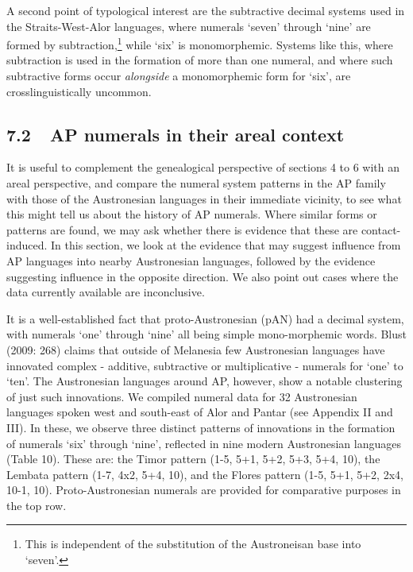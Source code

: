 A second point of typological interest are the subtractive decimal systems used in the Straits-West-Alor languages, where numerals {\textquoteleft}seven{\textquoteright} through {\textquoteleft}nine{\textquoteright} are formed by subtraction,\footnote{This is independent of the substitution of the Austroneisan base into {\textquoteleft}seven{\textquoteright}.} while {\textquoteleft}six{\textquoteright} is monomorphemic. Systems like this, where subtraction is used in the formation of more than one numeral, and where such subtractive forms occur \textit{alongside} a monomorphemic form for {\textquoteleft}six{\textquoteright}, are crosslinguistically uncommon. 

\subsection[7.2\ \ AP numerals in their areal context]{7.2\ \ AP numerals in their areal context}
It is useful to complement the genealogical perspective of sections 4 to 6 with an areal perspective, and compare the numeral system patterns in the AP family with those of the Austronesian languages in their immediate vicinity, to see what this might tell us about the history of AP numerals. Where similar forms or patterns are found, we may ask whether there is evidence that these are contact-induced. In this section, we look at the evidence that may suggest influence from AP languages into nearby Austronesian languages, followed by the evidence suggesting influence in the opposite direction. We also point out cases where the data currently available are inconclusive. 

It is a well-established fact that proto-Austronesian (pAN) had a decimal system, with numerals {\textquoteleft}one{\textquoteright} through {\textquoteleft}nine{\textquoteright} all being simple mono-morphemic words. Blust (2009: 268) claims that outside of Melanesia few Austronesian languages have innovated complex - additive, subtractive or multiplicative - numerals for {\textquoteleft}one{\textquoteright} to {\textquoteleft}ten{\textquoteright}. The Austronesian languages around AP, however, show a notable clustering of just such innovations. We compiled numeral data for 32 Austronesian languages spoken west and south-east of Alor and Pantar (see Appendix II and III). In these, we observe three distinct patterns of innovations in the formation of numerals {\textquoteleft}six{\textquoteright} through {\textquoteleft}nine{\textquoteright}, reflected in nine modern Austronesian languages (Table 10). These are: the Timor pattern (1-5, 5+1, 5+2, 5+3, 5+4, 10), the Lembata pattern (1-7, 4x2, 5+4, 10), and the 
Flores pattern (1-5, 5+1, 5+2, 2x4, 10-1, 10). Proto-Austronesian numerals are provided for comparative purposes in the top row. 

